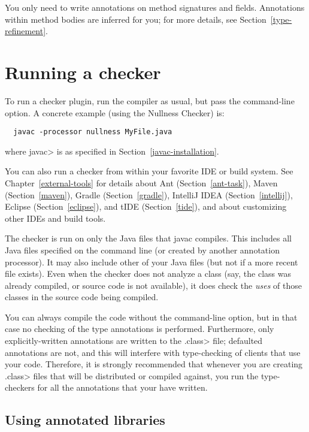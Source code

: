 You only need to write annotations on method signatures and fields.
Annotations within method bodies are inferred for you; for more details,
see  Section~\ref{type-refinement}.

\section{Running a checker\label{running}}

To run a checker plugin, run the compiler  as usual,
but pass the  command-line
option.
A concrete example (using the Nullness Checker) is:

\begin{Verbatim}
  javac -processor nullness MyFile.java
\end{Verbatim}

\noindent
where \<javac> is as specified in Section~\ref{javac-installation}.

You can also run a checker from within your favorite IDE or build system.  See
Chapter~\ref{external-tools} for details about
Ant (Section~\ref{ant-task}),
Maven (Section~\ref{maven}),
Gradle (Section~\ref{gradle}),
IntelliJ IDEA (Section~\ref{intellij}),
Eclipse (Section~\ref{eclipse}),
and
tIDE (Section~\ref{tide}),
and about customizing other IDEs and build tools.

The checker is run on only the Java files that javac compiles.
This includes all Java files specified on the command line (or
created by another annotation processor).  It may also include other of
your Java files (but not if a more recent  file exists).
Even when the checker does not analyze a class (say, the class was
already compiled, or source code is not available), it does check
the \emph{uses} of those classes in the source code being compiled.

You can always compile the code without the 
command-line option, but in that case no checking of the type
annotations is performed.  Furthermore, only explicitly-written annotations
are written to the \<.class> file; defaulted annotations are not, and this
will interfere with type-checking of clients that use your code.
Therefore, it is strongly recommended that whenever you are creating
\<.class> files that will be distributed or compiled against, you run the
type-checkers for all the annotations that your have written.


\subsection{Using annotated libraries\label{annotated-libraries-using}}


